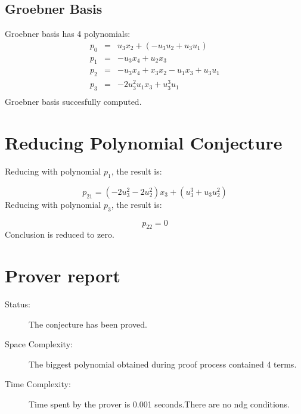 \documentclass[a4paper]{article}
\begin{document}
\subsection{Groebner Basis}

Groebner basis has 4 polynomials:\begin{eqnarray*}
p_{0} &=& u_{3}x_{2}+(-u_{3}u_{2}+u_{3}u_{1})\\
p_{1} &=& -u_{3}x_{4}+u_{2}x_{3}\\
p_{2} &=& -u_{3}x_{4}+x_{3}x_{2}-u_{1}x_{3}+u_{3}u_{1}\\
p_{3} &=& -2u_{3}^{2}u_{1}x_{3}+u_{3}^{3}u_{1}\\
\end{eqnarray*}
Groebner basis succesfully computed.





\section{Reducing Polynomial Conjecture}

Reducing with polynomial $p_{1}$, the result is:

$$
p_{21}  =  (-2u_{3}^{2}-2u_{2}^{2})x_{3}+(u_{3}^{3}+u_{3}u_{2}^{2})
$$
Reducing with polynomial $p_{3}$, the result is:

$$
p_{22}  =  0
$$
Conclusion is reduced to zero.





\section{Prover report}

\begin{description}

\item [Status:]  The conjecture has been proved.

\item [Space Complexity:]  The biggest polynomial obtained during proof process contained 4 terms.

\item [Time Complexity:]  Time spent by the prover is 0.001 seconds.There are no ndg conditions.

\end{description}
\end{document}
